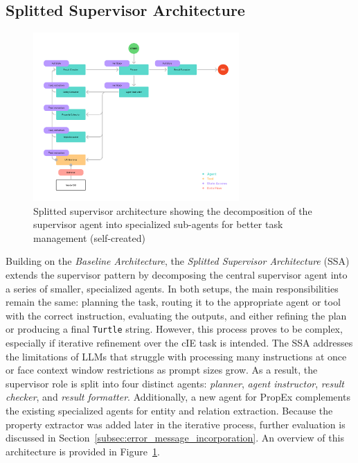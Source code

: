 \documentclass[a4paper,oneside,bibliography=totoc]{scrbook}
\begin{document}
\subsection{Splitted Supervisor Architecture}
\label{subsec:supervisor}

\begin{figure}[tp]
  \centering
  \includegraphics[width=0.7\textwidth]{figures/Splitted Supervisor Architecture.png}
  \caption[Splitted supervisor architecture showing the decomposition of the supervisor agent into specialized sub-agents for better task management]{Splitted supervisor architecture showing the decomposition of the supervisor agent into specialized sub-agents for better task management (self-created)}
  \label{fig:splitted_supervisor_architecture}
\end{figure}

Building on the \textit{Baseline Architecture}, the \textit{Splitted Supervisor Architecture} (\ac{SSA}) extends the supervisor pattern by decomposing the central supervisor agent into a series of smaller, specialized agents. In both setups, the main responsibilities remain the same: planning the task, routing it to the appropriate agent or tool with the correct instruction, evaluating the outputs, and either refining the plan or producing a final \texttt{Turtle} string. However, this process proves to be complex, especially if iterative refinement over the \ac{cIE} task is intended. The \ac{SSA} addresses the limitations of \acp{LLM} that struggle with processing many instructions at once or face context window restrictions as prompt sizes grow. As a result, the supervisor role is split into four distinct agents: \textit{planner}, \textit{agent instructor}, \textit{result checker}, and \textit{result formatter}. Additionally, a new agent for \ac{PropEx} complements the existing specialized agents for entity and relation extraction. Because the property extractor was added later in the iterative process, further evaluation is discussed in Section~\ref{subsec:error_message_incorporation}. An overview of this architecture is provided in Figure~\ref{fig:splitted_supervisor_architecture}.
\end{document}
